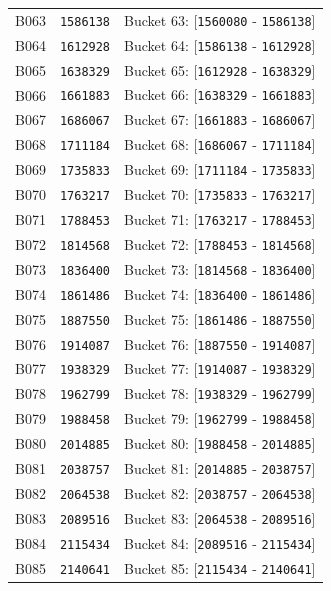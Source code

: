 \documentclass[11pt,a4paper]{article}
\begin{document}
{\begin{xltabular}{\textwidth}{l | C | C}
B063 & \texttt{1586138} & Bucket 63: [\texttt{1560080} - \texttt{1586138}] \\
B064 & \texttt{1612928} & Bucket 64: [\texttt{1586138} - \texttt{1612928}] \\
B065 & \texttt{1638329} & Bucket 65: [\texttt{1612928} - \texttt{1638329}] \\
B066 & \texttt{1661883} & Bucket 66: [\texttt{1638329} - \texttt{1661883}] \\
B067 & \texttt{1686067} & Bucket 67: [\texttt{1661883} - \texttt{1686067}] \\
B068 & \texttt{1711184} & Bucket 68: [\texttt{1686067} - \texttt{1711184}] \\
B069 & \texttt{1735833} & Bucket 69: [\texttt{1711184} - \texttt{1735833}] \\
B070 & \texttt{1763217} & Bucket 70: [\texttt{1735833} - \texttt{1763217}] \\
B071 & \texttt{1788453} & Bucket 71: [\texttt{1763217} - \texttt{1788453}] \\
B072 & \texttt{1814568} & Bucket 72: [\texttt{1788453} - \texttt{1814568}] \\
B073 & \texttt{1836400} & Bucket 73: [\texttt{1814568} - \texttt{1836400}] \\
B074 & \texttt{1861486} & Bucket 74: [\texttt{1836400} - \texttt{1861486}] \\
B075 & \texttt{1887550} & Bucket 75: [\texttt{1861486} - \texttt{1887550}] \\
B076 & \texttt{1914087} & Bucket 76: [\texttt{1887550} - \texttt{1914087}] \\
B077 & \texttt{1938329} & Bucket 77: [\texttt{1914087} - \texttt{1938329}] \\
B078 & \texttt{1962799} & Bucket 78: [\texttt{1938329} - \texttt{1962799}] \\
B079 & \texttt{1988458} & Bucket 79: [\texttt{1962799} - \texttt{1988458}] \\
B080 & \texttt{2014885} & Bucket 80: [\texttt{1988458} - \texttt{2014885}] \\
B081 & \texttt{2038757} & Bucket 81: [\texttt{2014885} - \texttt{2038757}] \\
B082 & \texttt{2064538} & Bucket 82: [\texttt{2038757} - \texttt{2064538}] \\
B083 & \texttt{2089516} & Bucket 83: [\texttt{2064538} - \texttt{2089516}] \\
B084 & \texttt{2115434} & Bucket 84: [\texttt{2089516} - \texttt{2115434}] \\
B085 & \texttt{2140641} & Bucket 85: [\texttt{2115434} - \texttt{2140641}] \\

\end{xltabular}}
\end{document}
